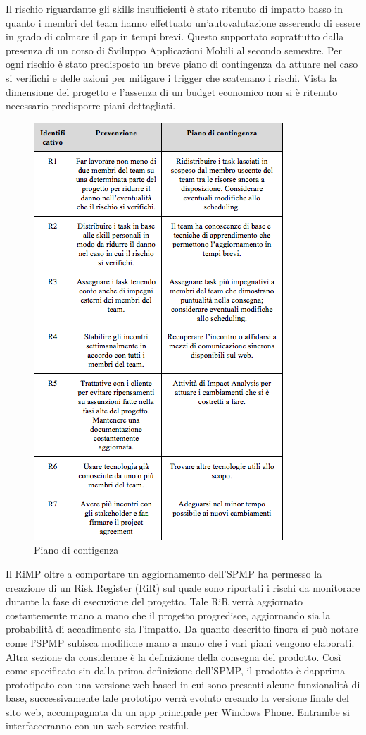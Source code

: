 Il rischio riguardante gli skills insufficienti \`{e} stato ritenuto di impatto basso in quanto i membri del team hanno effettuato un\rq autovalutazione asserendo di essere in grado di colmare il gap in tempi brevi. Questo supportato soprattutto dalla presenza di un corso di Sviluppo Applicazioni Mobili al secondo semestre.
Per ogni rischio \`{e} stato predisposto un breve piano di contingenza da attuare nel caso si verifichi e delle azioni per mitigare i trigger che scatenano i rischi. Vista la dimensione del progetto e l\rq assenza di un budget economico non si \`{e} ritenuto necessario predisporre piani dettagliati.
\begin{figure}[h]
\centering
\includegraphics[scale=.6]{img/18.png}
\caption{Piano di contigenza}
\label{fig:cd}
\end{figure}
Il RiMP oltre a comportare un aggiornamento dell\rq SPMP ha permesso la creazione di un Risk Register (RiR) sul quale sono riportati i rischi da monitorare durante la fase di esecuzione del progetto.
Tale RiR verr\`{a} aggiornato costantemente mano a mano che il progetto progredisce, aggiornando sia la probabilit\`{a} di accadimento sia l\rq impatto.
Da quanto descritto finora si pu\`{o} notare come l\rq SPMP subisca modifiche mano a mano che i vari piani vengono elaborati. Altra sezione da considerare \`{e} la definizione della consegna del prodotto. Cos\`{i} come specificato sin dalla prima definizione dell\rq SPMP, il prodotto \`{e} dapprima prototipato con una versione web-based in cui sono presenti alcune funzionalit\`{a} di base, successivamente tale prototipo verr\`{a} evoluto creando la versione finale del sito web, accompagnata da un app principale per Windows Phone. Entrambe si interfacceranno con un web service restful.

